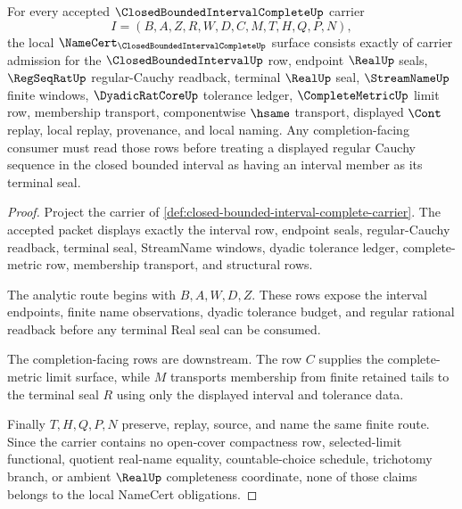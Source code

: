 \begin{theorem}
\label{thm:closed-bounded-interval-complete-namecert-obligations}
For every accepted $\ClosedBoundedIntervalCompleteUp$ carrier
$$
I=(B,A,Z,R,W,D,C,M,T,H,Q,P,N),
$$
the local $\NameCert_{\ClosedBoundedIntervalCompleteUp}$ surface consists exactly of carrier admission for the $\ClosedBoundedIntervalUp$ row, endpoint $\RealUp$ seals, $\RegSeqRatUp$ regular-Cauchy readback, terminal $\RealUp$ seal, $\StreamNameUp$ finite windows, $\DyadicRatCoreUp$ tolerance ledger, $\CompleteMetricUp$ limit row, membership transport, componentwise $\hsame$ transport, displayed $\Cont$ replay, local replay, provenance, and local naming. Any completion-facing consumer must read those rows before treating a displayed regular Cauchy sequence in the closed bounded interval as having an interval member as its terminal seal.
\end{theorem}
\begin{proof}
Project the carrier of \autoref{def:closed-bounded-interval-complete-carrier}. The accepted packet displays exactly the interval row, endpoint seals, regular-Cauchy readback, terminal seal, StreamName windows, dyadic tolerance ledger, complete-metric row, membership transport, and structural rows.

The analytic route begins with $B,A,W,D,Z$. These rows expose the interval endpoints, finite name observations, dyadic tolerance budget, and regular rational readback before any terminal Real seal can be consumed.

The completion-facing rows are downstream. The row $C$ supplies the complete-metric limit surface, while $M$ transports membership from finite retained tails to the terminal seal $R$ using only the displayed interval and tolerance data.

Finally $T,H,Q,P,N$ preserve, replay, source, and name the same finite route. Since the carrier contains no open-cover compactness row, selected-limit functional, quotient real-name equality, countable-choice schedule, trichotomy branch, or ambient $\RealUp$ completeness coordinate, none of those claims belongs to the local NameCert obligations.
\end{proof}


